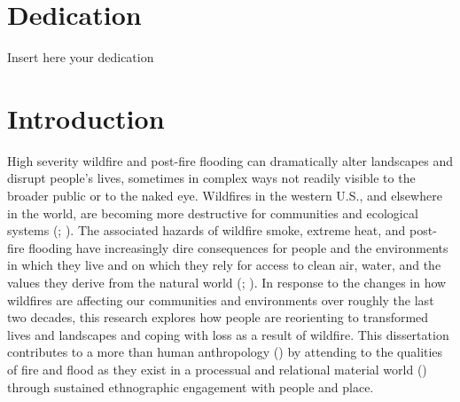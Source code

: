\documentclass[
]{article}
\begin{document}
\clearpage

\section*{Dedication}

\begin{center}
    \vspace*{\fill}
    Insert here your dedication
    \vspace*{\fill}
\end{center}

\clearpage

\section{Introduction}\label{introduction}


\renewcommand{\thefigure}{1.\arabic{figure}}
\setcounter{figure}{0}
\renewcommand{\thetable}{1.\arabic{table}}
\setcounter{table}{0}
\renewcommand{\theequation}{1.\arabic{equation}}
\setcounter{equation}{0}

High severity wildfire and post-fire flooding can dramatically alter landscapes and disrupt people's lives, sometimes in complex ways not readily visible to the broader public or to the naked eye. Wildfires in the western U.S., and elsewhere in the world, are becoming more destructive for communities and ecological systems (; ). The associated hazards of wildfire smoke, extreme heat, and post-fire flooding have increasingly dire consequences for people and the environments in which they live and on which they rely for access to clean air, water, and the values they derive from the natural world (; ). In response to the changes in how wildfires are affecting our communities and environments over roughly the last two decades, this research explores how people are reorienting to transformed lives and landscapes and coping with loss as a result of wildfire. This dissertation contributes to a more than human anthropology () by attending to the qualities of fire and flood as they exist in a processual and relational material world () through sustained ethnographic engagement with people and place.
\end{document}
